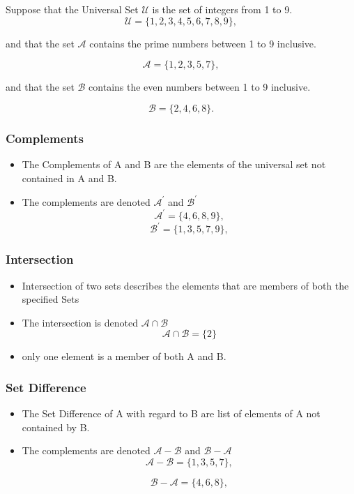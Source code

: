 \documentclass[]{report}
\begin{document}
Suppose that the Universal Set $\mathcal{U}$ is the set of integers from 1 to 9.
\[ \mathcal{U} = \{1,2,3,4,5,6,7,8,9\}, \]

and that the set $\mathcal{A}$ contains the prime numbers between 1 to 9 inclusive.

\[ \mathcal{A} = \{1,2,3,5,7\}, \]

and that the set $\mathcal{B}$ contains the even numbers between 1 to 9 inclusive.

\[ \mathcal{B} = \{2,4,6,8\}. \]

\subsubsection*{Complements}
\begin{itemize}
	
	\item The Complements of A and B are the elements of the universal set not contained in A and B.
	
	\item The complements are denoted $\mathcal{A}^{\prime}$ and $\mathcal{B}^{\prime}$
	\[ \mathcal{A}^{\prime} = \{4,6,8,9\}, \]
	\[ \mathcal{B}^{\prime} = \{1,3,5,7,9\}, \]
	
\end{itemize}



\subsubsection*{Intersection}
\begin{itemize}
	
	\item Intersection of two sets describes the elements that are members of both the specified Sets
	
	\item The intersection is denoted $\mathcal{A\cap B}$ 
	\[ \mathcal{A\cap B} = \{2\}\]
	
	\item only one element is a member of both A and B.
\end{itemize}

\subsubsection*{Set Difference}
\begin{itemize}
	
	\item The Set Difference of A with regard to B are list of elements of A not contained by B.
	
	\item The complements are denoted $\mathcal{A-B}$ and $\mathcal{B-A}$
	\[ \mathcal{A-B} = \{1,3,5,7\}, \]
	
	\[ \mathcal{B-A} = \{4,6,8\}, \]
\end{itemize}
\end{document}
